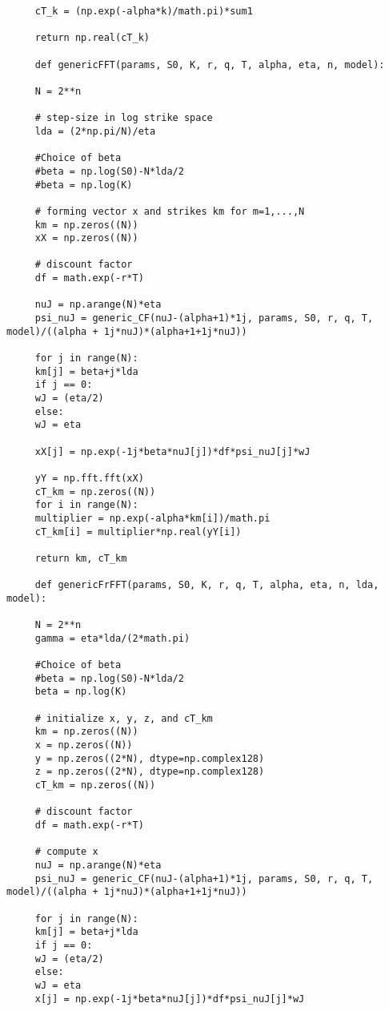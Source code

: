 \documentclass[letterpaper]{article}
\begin{document}
\begin{lstlisting}
     cT_k = (np.exp(-alpha*k)/math.pi)*sum1
     
     return np.real(cT_k) 
     
     def genericFFT(params, S0, K, r, q, T, alpha, eta, n, model):
     
     N = 2**n
     
     # step-size in log strike space
     lda = (2*np.pi/N)/eta
     
     #Choice of beta
     #beta = np.log(S0)-N*lda/2
     #beta = np.log(K)
     
     # forming vector x and strikes km for m=1,...,N
     km = np.zeros((N))
     xX = np.zeros((N))
     
     # discount factor
     df = math.exp(-r*T)
     
     nuJ = np.arange(N)*eta
     psi_nuJ = generic_CF(nuJ-(alpha+1)*1j, params, S0, r, q, T, model)/((alpha + 1j*nuJ)*(alpha+1+1j*nuJ))
     
     for j in range(N):  
     km[j] = beta+j*lda
     if j == 0:
     wJ = (eta/2)
     else:
     wJ = eta
     
     xX[j] = np.exp(-1j*beta*nuJ[j])*df*psi_nuJ[j]*wJ
     
     yY = np.fft.fft(xX)
     cT_km = np.zeros((N))  
     for i in range(N):
     multiplier = np.exp(-alpha*km[i])/math.pi
     cT_km[i] = multiplier*np.real(yY[i])
     
     return km, cT_km
     
     def genericFrFFT(params, S0, K, r, q, T, alpha, eta, n, lda, model):
     
     N = 2**n
     gamma = eta*lda/(2*math.pi)
     
     #Choice of beta
     #beta = np.log(S0)-N*lda/2
     beta = np.log(K)
     
     # initialize x, y, z, and cT_km
     km = np.zeros((N))
     x = np.zeros((N))
     y = np.zeros((2*N), dtype=np.complex128)
     z = np.zeros((2*N), dtype=np.complex128)
     cT_km = np.zeros((N)) 
     
     # discount factor
     df = math.exp(-r*T)
     
     # compute x
     nuJ = np.arange(N)*eta
     psi_nuJ = generic_CF(nuJ-(alpha+1)*1j, params, S0, r, q, T, model)/((alpha + 1j*nuJ)*(alpha+1+1j*nuJ))
     
     for j in range(N):  
     km[j] = beta+j*lda
     if j == 0:
     wJ = (eta/2)
     else:
     wJ = eta
     x[j] = np.exp(-1j*beta*nuJ[j])*df*psi_nuJ[j]*wJ
     

\end{lstlisting}
\end{document}
